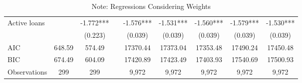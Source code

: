 \begin{sidewaystable}[p]
\begin{tabular}{lcclccccc}
Active loans         &                     & -1.772***           &  & -1.576*** & -1.531*** & -1.560*** & -1.579*** & -1.530*** \\
                     &                     & (0.223)             &  & (0.039)   & (0.039)   & (0.039)   & (0.039)   & (0.039)   \\ \hline
AIC                  & 648.59              & 574.49              &  & 17370.44  & 17373.04  & 17353.48  & 17490.24  & 17450.48  \\
BIC                  & 674.49              & 604.09              &  & 17420.89  & 17423.49  & 17403.93  & 17540.69  & 17500.93  \\
Observations         & 299                 & 299                 &  & 9,972     & 9,972     & 9,972     & 9,972     & 9,972     \\ \hline
\end{tabular}%
\caption*{\footnotesize{Note: Regressions Considering Weights}}
\end{sidewaystable}